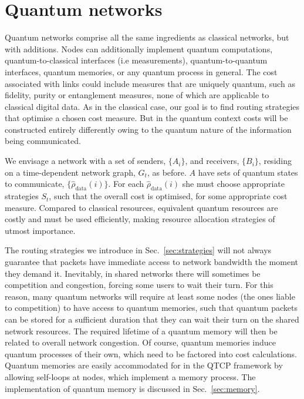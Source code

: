 \documentclass[aps, rmp, twocolumn, amsmath, amssymb, nofootinbib, superscriptaddress, longbibliography, floatfix, table-of-contents, eqsecnum]{revtex4-1}
\begin{document}
\section{Quantum networks} \label{sec:quant_net} 

Quantum networks comprise all the same ingredients as classical networks, but with additions. Nodes can additionally implement quantum computations, quantum-to-classical interfaces (i.e measurements), quantum-to-quantum interfaces, quantum memories, or any quantum process in general. The cost associated with links could include measures that are uniquely quantum, such as fidelity, purity or entanglement measures, none of which are applicable to classical digital data. As in the classical case, our goal is to find routing strategies that optimise a chosen cost measure. But in the quantum context costs will be constructed entirely differently owing to the quantum nature of the information being communicated.

We envisage a network with a set of senders, $\{A_i\}$, and receivers, $\{B_i\}$, residing on a time-dependent network graph, $G_t$, as before. $A$ have sets of quantum states to communicate, $\{\hat\rho_\text{data}(i)\}$. For each $\hat\rho_\text{data}(i)$ she must choose appropriate strategies $S_t$, such that the overall cost is optimised, for some appropriate cost measure. Compared to classical resources, equivalent quantum resources are costly and must be used efficiently, making resource allocation strategies of utmost importance.

The routing strategies we introduce in Sec.~\ref{sec:strategies} will not always guarantee that packets have immediate access to network bandwidth the moment they demand it. Inevitably, in shared networks there will sometimes be competition and congestion, forcing some users to wait their turn. For this reason, many quantum networks will require at least some nodes (the ones liable to competition) to have access to quantum memories, such that quantum packets can be stored for a sufficient duration that they can wait their turn on the shared network resources. The required lifetime of a quantum memory will then be related to overall network congestion. Of course, quantum memories induce quantum processes of their own, which need to be factored into cost calculations. Quantum memories are easily accommodated for in the QTCP framework by allowing self-loops at nodes, which implement a memory process. The implementation of quantum memory is discussed in Sec.~\ref{sec:memory}.
\end{document}

